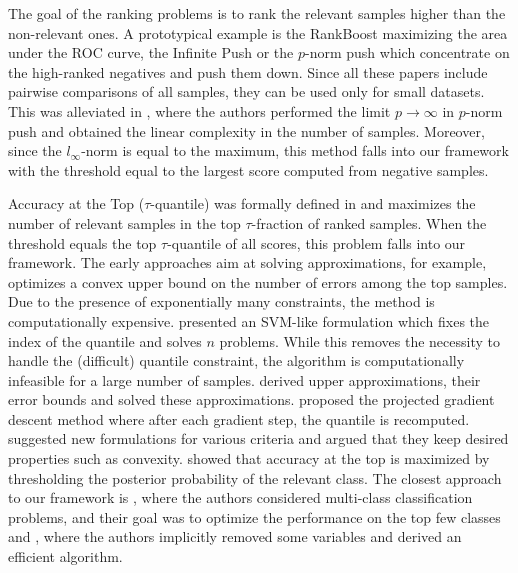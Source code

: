 The goal of the ranking problems is to rank the relevant samples higher than the non-relevant ones. A prototypical example is the RankBoost \cite{freund2003efficient} maximizing the area under the ROC curve, the Infinite Push \cite{agarwal2011infinite} or the $p$-norm push \cite{rudin2009pnorm} which concentrate on the high-ranked negatives and push them down. Since all these papers include pairwise comparisons of all samples, they can be used only for small datasets. This was alleviated in \cite{li2014top}, where the authors performed the limit $p \to \infty$ in $p$-norm push and obtained the linear complexity in the number of samples. Moreover, since the $l_{\infty}$-norm is equal to the maximum, this method falls into our framework with the threshold equal to the largest score computed from negative samples.

Accuracy at the Top ($\tau$-quantile) was formally defined in \cite{boyd2012accuracy} and maximizes the number of relevant samples in the top $\tau$-fraction of ranked samples. When the threshold equals the top $\tau$-quantile of all scores, this problem falls into our framework. The early approaches aim at solving approximations, for example, \cite{joachims2005svm} optimizes a convex upper bound on the number of errors among the top samples. Due to the presence of exponentially many constraints, the method is computationally expensive. \cite{boyd2012accuracy} presented an SVM-like formulation which fixes the index of the quantile and solves $n$ problems. While this removes the necessity to handle the (difficult) quantile constraint, the algorithm is computationally infeasible for a large number of samples. \cite{kar2015surrogate} derived upper approximations, their error bounds and solved these approximations. \cite{grill2016learning} proposed the projected gradient descent method where after each gradient step, the quantile is recomputed. \cite{eban2017scalable} suggested new formulations for various criteria and argued that they keep desired properties such as convexity. \cite{tasche2018plug} showed that accuracy at the top is maximized by thresholding the posterior probability of the relevant class. The closest approach to our framework is \cite{lapin2015top,lapin2018analysis}, where the authors considered multi-class classification problems, and their goal was to optimize the performance on the top few classes and \cite{mackey2018constrained}, where the authors implicitly removed some variables and derived an efficient algorithm.

